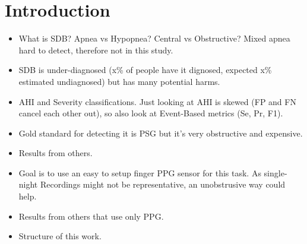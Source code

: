 \chapter{Introduction \label{Chapter-Intro}}

\begin{itemize}
    \item What is SDB? Apnea vs Hypopnea? Central vs Obstructive? Mixed apnea hard to detect, therefore not in this study.
    \item SDB is under-diagnosed (x\% of people have it dignosed, expected x\% estimated undiagnosed) but has many potential harms.
    \item AHI and Severity classifications. Just looking at AHI is skewed (FP and FN cancel each other out), so also look at Event-Based metrics (Se, Pr, F1).
    \item Gold standard for detecting it is PSG but it's very obstructive and expensive.
    \item Results \cite{xie2023use} from others.
    \item Goal is to use an easy to setup finger PPG sensor for this task. As single-night Recordings might not be representative, an unobstrusive way could help.
    \item Results from others that use only PPG.
    \item Structure of this work.
\end{itemize}

